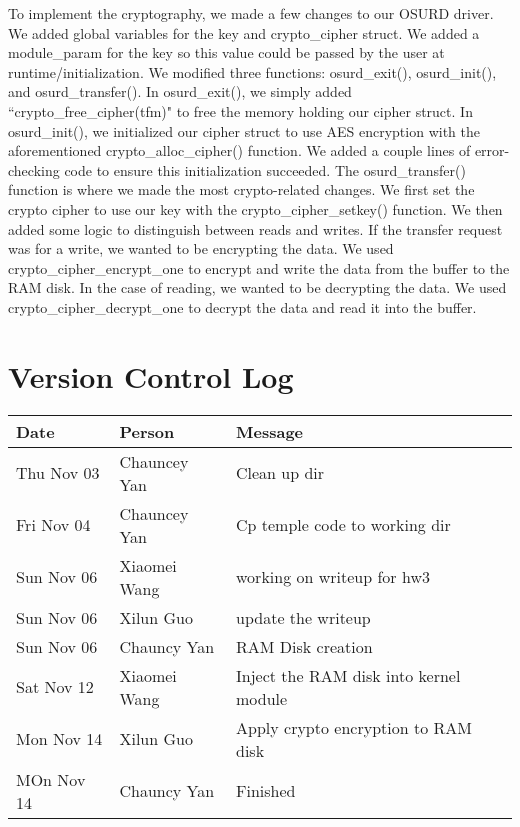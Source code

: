 \documentclass[10pt,draftclsnofoot,onecolumn,journal,compsoc]{IEEEtran}
\begin{document}
To implement the cryptography, we made a few changes to our OSURD driver. We added global variables for the key and crypto\_cipher struct. We added a module\_param for the key so this value could be passed by the user at runtime/initialization. We modified three functions: osurd\_exit(), osurd\_init(), and osurd\_transfer(). In osurd\_exit(), we simply added ``crypto\_free\_cipher(tfm)" to free the memory holding our cipher struct. In osurd\_init(), we initialized our cipher struct to use AES encryption with the aforementioned crypto\_alloc\_cipher() function. We added a couple lines of error-checking code to ensure this initialization succeeded. The osurd\_transfer() function is where we made the most crypto-related changes. We first set the crypto cipher to use our key with the crypto\_cipher\_setkey() function. We then added some logic to distinguish between reads and writes. If the transfer request was for a write, we wanted to be encrypting the data. We used crypto\_cipher\_encrypt\_one to encrypt and write the data from the buffer to the RAM disk. In the case of reading, we wanted to be decrypting the data. We used crypto\_cipher\_decrypt\_one to decrypt the data and read it into the buffer.




\section{Version Control Log}
\begin{tabular}{ | l | l | l |}
    \hline
     Date & Person & Message \\ \hline
     Thu Nov 03 & Chauncey Yan & Clean up dir  \\ \hline
     Fri Nov 04 & Chauncey Yan & Cp temple code to working dir   \\ \hline
     Sun Nov 06 & Xiaomei Wang & working on writeup for hw3 \\ \hline
     Sun Nov 06 & Xilun Guo    & update the writeup \\ \hline
     Sun Nov 06 & Chauncy Yan  & RAM Disk creation \\ \hline
     Sat Nov 12 & Xiaomei Wang & Inject the RAM disk into kernel module \\ \hline 
     Mon Nov 14 & Xilun Guo    & Apply crypto encryption to RAM disk \\ \hline
     MOn Nov 14 & Chauncy Yan  & Finished \\ \hline  
\end{tabular}
\end{document}
